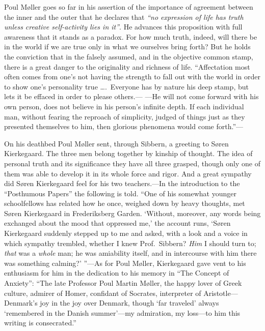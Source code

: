 \documentclass[12pt,a4paper]{book}
\newcommand{\opage}[1]{\marginnote{\footnotesize\textit{[#1]}}}
\begin{document}
Poul Møller goes so far in his assertion of the importance of agreement
between the inner and the outer that he declares that \textit{``no
expression of life has truth unless creative self-activity lies in it''}.
He advances this proposition with full awareness that it stands as a
paradox. For how much truth, indeed, will there be in the world if we are
true only in what we ourselves bring forth? But he holds the conviction
that in the falsely assumed, and in the objective common stamp, there is a
great danger to the originality and richness of life. ``Affectation most
often comes from one's not having the strength to fall out with the world
in order to show one's personality true \dots.\ Everyone has by nature his
deep stamp, but lets it be effaced in order to please others.--- ---He will
not come
\opage{26}forward with his own person, does not believe in his person's infinite
depth. If each individual man, without fearing the reproach of simplicity,
judged of things just as they presented themselves to him, then glorious
phenomena would come forth.''---

On his deathbed Poul Møller sent, through Sibbern, a greeting to Søren
Kierkegaard. The three men belong together by kinship of thought. The idea
of personal truth and its significance they have all three grasped, though
only one of them was able to develop it in its whole force and rigor. And a
great sympathy did Søren Kierkegaard feel for his two teachers.---In the
introduction to the ``Posthumous Papers'' the following is told. ``One of
his somewhat younger schoolfellows has related how he once, weighed down
by heavy thoughts, met Søren Kierkegaard in Frederiksberg Garden.
`Without, moreover, any words being exchanged about the mood that
oppressed me,' the account runs, `Søren Kierkegaard suddenly stepped up to
me and asked, with a look and a voice in which sympathy trembled, whether
I knew Prof.\ Sibbern? \textit{Him} I should turn to; \textit{that} was a
\textit{whole} man; he was amiability itself, and in intercourse with him
there was something calming?' ''---As for Poul Møller, Kierkegaard gave
vent to his enthusiasm for him in the dedication to his memory in ``The
Concept of Anxiety'': ``The late Professor Poul Martin Møller, the happy
lover of Greek culture, admirer of Homer, confidant of Socrates,
interpreter of Aristotle---Denmark's joy in the joy over Denmark, though
`far traveled' always `remembered in the Danish summer'---my admiration,
my loss---to him this writing is consecrated.''
\end{document}
